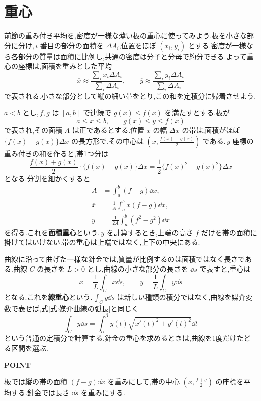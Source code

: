 \section{重心}\label{節:面積重心と線重心}

前節の重み付き平均を,密度が一様な薄い板の重心に使ってみよう.板を小さな部分に分け,\,$i$ 番目の部分の面積を $\Delta A_i$,位置をほぼ $(x_i,y_i)$ とする.密度が一様なら各部分の質量は面積に比例し,共通の密度は分子と分母で約分できる.よって重心の座標は,面積を重みとした平均
\[
\overline x\approx\frac{\sum_i x_i\Delta A_i}{\sum_i\Delta A_i},\qquad
\overline y\approx\frac{\sum_i y_i\Delta A_i}{\sum_i\Delta A_i}
\]
で表される.小さな部分として縦の細い帯をとり,この和を定積分に帰着させよう.

$a<b$ とし,\,$f,g$ は $[a,b]$ で連続で $g(x)\le f(x)$ を満たすとする.板が
\[
a\le x\le b,\qquad g(x)\le y\le f(x)
\]
で表され,その面積 $A$ は正であるとする.位置 $x$ の幅 $\Delta x$ の帯は,面積がほぼ $\{f(x)-g(x)\}\Delta x$ の長方形で,その中心は $\left(x,\frac{f(x)+g(x)}{2}\right)$ である.\,$y$ 座標の重み付きの和を作ると,帯1つ分は
\[
\frac{f(x)+g(x)}{2}\cdot\{f(x)-g(x)\}\Delta x
 =\frac12\{f(x)^2-g(x)^2\}\Delta x
\]
となる.分割を細かくすると
\begin{equation}\label{式:面積の重心}
\begin{aligned}
A&=\int_a^b(f-g)\dd x,\\
\overline x&=\frac1A\int_a^b x(f-g)\dd x,\\
\overline y&=\frac1{2A}\int_a^b(f^2-g^2)\dd x
\end{aligned}
\end{equation}
を得る.これを\textbf{面積重心}という.\,$\overline y$ を計算するとき,上端の高さ $f$ だけを帯の面積に掛けてはいけない.帯の重心は上端ではなく,上下の中央にある.

曲線に沿って曲げた一様な針金では,質量が比例するのは面積ではなく長さである.曲線 $C$ の長さを $L>0$ とし,曲線の小さな部分の長さを $\dd s$ で表すと,重心は
\begin{equation}\label{式:線の重心}
\overline x=\frac1L\int_C x\dd s,\qquad
\overline y=\frac1L\int_C y\dd s
\end{equation}
となる.これを\textbf{線重心}という.\,$\int_C y\dd s$ は新しい種類の積分ではなく,曲線を媒介変数で表せば,式\eqref{式:媒介曲線の弧長}と同じく
\[
\int_C y\dd s
 =\int_\alpha^\beta y(t)\sqrt{x'(t)^2+y'(t)^2}\dd t
\]
という普通の定積分で計算する.針金の重心を求めるときは,曲線を1度だけたどる区間を選ぶ.

\begin{bookpoint}
\textbf{POINT}\par
板では縦の帯の面積 $(f-g)\dd x$ を重みにして,帯の中心 $\left(x,\frac{f+g}{2}\right)$ の座標を平均する.針金では長さ $\dd s$ を重みにする.
\end{bookpoint}

